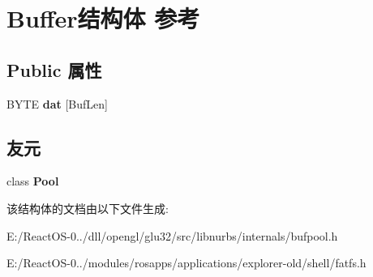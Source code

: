 \hypertarget{class_buffer}{}\section{Buffer结构体 参考}
\label{class_buffer}
\subsection*{Public 属性}
\begin{DoxyCompactItemize}
\item 
\mbox{\label{class_buffer_aa245be12fa171b8eb770c8ad4baf524b}} 
B\+Y\+TE {\bfseries dat} \mbox{[}Buf\+Len\mbox{]}
\end{DoxyCompactItemize}
\subsection*{友元}
\begin{DoxyCompactItemize}
\item 
\mbox{\label{class_buffer_aaa45caad0db0173735281fcdf9aa5e8b}} 
class {\bfseries Pool}
\end{DoxyCompactItemize}


该结构体的文档由以下文件生成\+:\begin{DoxyCompactItemize}
\item 
E\+:/\+React\+O\+S-\/0../dll/opengl/glu32/src/libnurbs/internals/bufpool.\+h\item 
E\+:/\+React\+O\+S-\/0../modules/rosapps/applications/explorer-\/old/shell/fatfs.\+h\end{DoxyCompactItemize}
